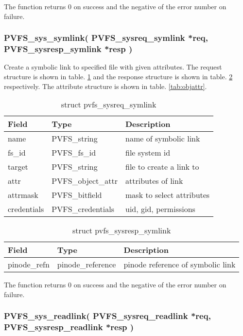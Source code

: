 \documentclass[11pt, letterpaper]{article}
\begin{document}
The function returns 0 on success and the negative of the error
number on failure.

\subsubsection{PVFS\_sys\_symlink(
PVFS\_sysreq\_symlink *req,
PVFS\_sysresp\_symlink *resp
)}

Create a symbolic link to specified file with given attributes. The
request structure is shown in table. \ref{tab:reqsym} and the response
structure is shown in table. \ref{tab:respsym} respectively. The
attribute structure is shown in table. \ref{tab:objattr}.

\begin{table}[H]
\begin{tabular}{|l|l|l|}
\hline
Field & Type & Description \\
\hline
\hline
name & PVFS\_string & name of symbolic link \\
\hline
fs\_id & PVFS\_fs\_id & file system id \\
\hline
target & PVFS\_string & file to create a link to \\
\hline
attr & PVFS\_object\_attr & attributes of link \\
\hline
attrmask & PVFS\_bitfield & mask to select attributes \\
\hline
credentials & PVFS\_credentials & uid, gid, permissions \\
\hline
\end{tabular}
\caption{struct pvfs\_sysreq\_symlink}\label{tab:reqsym}
\end{table}

\begin{table}[H]
\begin{tabular}{|l|l|l|}
\hline
Field & Type & Description \\
\hline
\hline
pinode\_refn & pinode\_reference & pinode reference of symbolic link \\ 
\hline
\end{tabular}
\caption{struct pvfs\_sysresp\_symlink}\label{tab:respsym}
\end{table}

The function returns 0 on success and the negative of the error
number on failure.

\subsubsection{PVFS\_sys\_readlink(
PVFS\_sysreq\_readlink *req,
PVFS\_sysresp\_readlink *resp
)}
\end{document}
